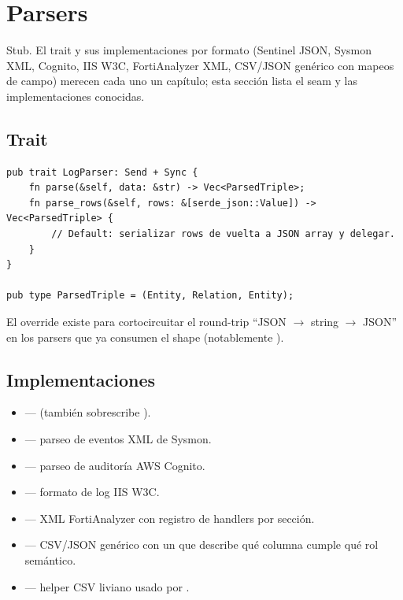 \chapter{Parsers}
\label{ch:parsers}

\begin{note}
Stub. El trait  y sus implementaciones por
formato (Sentinel JSON, Sysmon XML, Cognito, IIS W3C,
FortiAnalyzer XML, CSV/JSON genérico con mapeos de campo)
merecen cada uno un capítulo; esta sección lista el seam y las
implementaciones conocidas.
\end{note}

\section{Trait}

\begin{lstlisting}[style=rust]
pub trait LogParser: Send + Sync {
    fn parse(&self, data: &str) -> Vec<ParsedTriple>;
    fn parse_rows(&self, rows: &[serde_json::Value]) -> Vec<ParsedTriple> {
        // Default: serializar rows de vuelta a JSON array y delegar.
    }
}

pub type ParsedTriple = (Entity, Relation, Entity);
\end{lstlisting}

El override  existe para cortocircuitar el
round-trip ``JSON $\to$ string $\to$ JSON'' en los parsers que ya
consumen el shape  (notablemente
).

\section{Implementaciones}

\begin{itemize}
    \item {} ---
         (también sobrescribe ).
    \item {} --- parseo
        de eventos XML de Sysmon.
    \item {} --- parseo
        de auditoría AWS Cognito.
    \item {} ---
        formato de log IIS W3C.
    \item {}
        --- XML FortiAnalyzer con registro de handlers por
        sección.
    \item {} ---
        CSV/JSON genérico con un  que
        describe qué columna cumple qué rol semántico.
    \item {} ---
        helper CSV liviano usado por .
\end{itemize}

